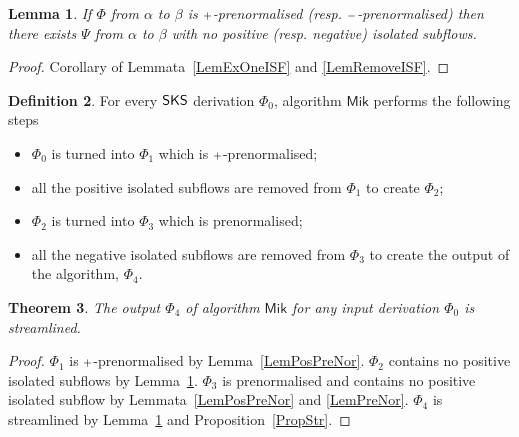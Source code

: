 \documentclass[a4paper]{amsart}
\newif\iflmcs\lmcsfalse %
\newtheorem{thm}{Theorem}[section]
\newtheorem{lem}[thm]{Lemma}
\theoremstyle{remark}
\theoremstyle{definition}
\newtheorem{defi}[thm]{Definition}
\begin{document}
\begin{lem}\label{LemNoISF}
If $\Phi$ from $\alpha$ to $\beta$ is $\ppl$-prenormalised (resp. $\pmi$-prenormalised) then there exists $\Psi$ from $\alpha$ to $\beta$ with no positive (resp. negative) isolated subflows.
\end{lem}
\begin{proof}
Corollary of Lemmata~\ref{LemExOneISF} and \ref{LemRemoveISF}.
\end{proof}

\newcommand{\Mik}{\mathsf{Mik}}
\begin{defi}
For every $\mathsf{SKS}$ derivation $\Phi_0$, algorithm $\Mik$ performs the following steps
\begin{itemize}
  \item $\Phi_0$ is turned into $\Phi_1$ which is $\ppl$-prenormalised;
  \item all the positive isolated subflows are removed from $\Phi_1$ to create $\Phi_2$;
  \item $\Phi_2$ is turned into $\Phi_3$ which is prenormalised;
  \item all the negative isolated subflows are removed from $\Phi_3$ to create the output of the algorithm, $\Phi_4$.
\end{itemize}

\end{defi}

\begin{thm}
The output $\Phi_4$ of algorithm $\Mik$ for any input derivation $\Phi_0$ is streamlined.
\end{thm}

\begin{proof}
$\Phi_1$ is $\ppl$-prenormalised by Lemma~\ref{LemPosPreNor}. $\Phi_2$ contains no positive isolated subflows by Lemma~\ref{LemNoISF}. $\Phi_3$ is prenormalised and contains no positive isolated subflow by Lemmata~\ref{LemPosPreNor} and \ref{LemPreNor}. $\Phi_4$ is streamlined by Lemma~\ref{LemNoISF} and Proposition~\ref{PropStr}.
\end{proof}



\iflmcs\else\let\oldurl\url\renewcommand{\url}[1]{\hfill\break\oldurl{#1}}\fi



\end{document}

